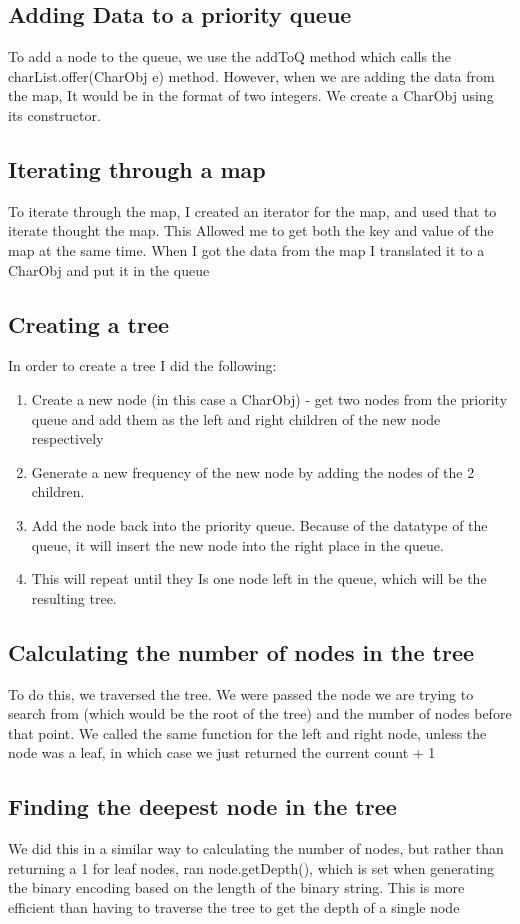 \documentclass[11pt, oneside]{amsart}
\begin{document}
\subsection{Adding Data to a priority queue}
To add a node to the queue, we use the addToQ method which calls the charList.offer(CharObj e) method. However, when we are adding the data from the map, It would be in the format of two integers. We create a CharObj using its constructor. 
\subsection{Iterating through a map}
To iterate through the map, I created an iterator for the map, and used that to iterate thought the map. This Allowed me to get both the key and value of the map at the same time. When I got the data from the map I translated it to a CharObj and put it in the queue
\subsection{Creating a tree}
In order to create a tree I did the following:
\begin{enumerate}
	\item Create a new node (in this case a CharObj) - get two nodes from the priority queue and add them as the left and right children of the new node respectively
	\item Generate a new frequency of the new node by adding the nodes of the 2 children. 
	\item Add the node back into the priority queue. Because of the datatype of the queue, it will insert the new node into the right place in the queue.
	\item This will repeat until they Is one node left in the queue, which will be the resulting tree.
\end{enumerate}
\subsection{Calculating the number of nodes in the tree}
To do this, we traversed the tree. We were passed the node we are trying to search from (which would be the root of the tree) and the number of nodes before that point. We called the same function for the left and right node, unless the node was a leaf, in which case we just returned the current count + 1
\subsection{Finding the deepest node in the tree}
We did this in a similar way to calculating the number of nodes, but rather than returning a 1 for leaf nodes, ran node.getDepth(), which is set when generating the binary encoding based on the length of the binary string. This is more efficient than having to traverse the tree to get the depth of a single node
\end{document}
